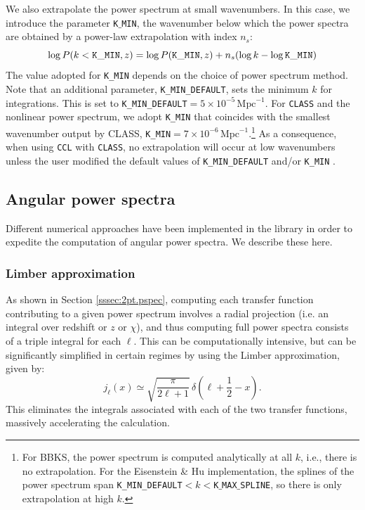 \documentclass[\docopts]{\docclass}
\begin{document}
We also extrapolate the power spectrum at small wavenumbers. In this case, we introduce the parameter {\tt K$\_$MIN}, the wavenumber below which the power spectra are obtained by a power-law extrapolation with index $n_s$:
\begin{equation}
  \log P(k<{\tt K\_MIN},z) = \log P({\tt K\_MIN},z) + n_s (\log k-\log{\tt K\_MIN})
\end{equation}
The value adopted for {\tt K\_MIN} depends on the choice of power spectrum method. Note that an additional parameter, {\tt K\_MIN\_DEFAULT}, sets the minimum $k$ for integrations. This is set to {\tt K\_MIN\_DEFAULT}$=5\times 10^{-5}\,\text{Mpc}^{-1}$. For {\tt CLASS} and the nonlinear power spectrum, we adopt {\tt K\_MIN} that coincides with the smallest wavenumber output by CLASS, {\tt K\_MIN}$=7\times 10^{-6}\,\text{Mpc}^{-1}$.\footnote{For BBKS, the power spectrum is computed analytically at all $k$, i.e., there is no extrapolation. For the Eisenstein \& Hu implementation, the splines of the power spectrum span {\tt K\_MIN\_DEFAULT}$<k<${\tt K$\_$MAX$\_$SPLINE}, so there is only extrapolation at high $k$.} As a consequence, when using {\tt CCL} with {\tt CLASS}, no extrapolation will occur at low wavenumbers unless the user modified the default values of {\tt K\_MIN\_DEFAULT} and/or {\tt K\_MIN} .

\subsection{Angular power spectra}

Different numerical approaches have been implemented in the library in order to expedite the computation of angular power spectra. We describe these here.

\subsubsection{Limber approximation}

As shown in Section \ref{sssec:2pt.pspec}, computing each transfer function contributing to a given power spectrum involves a radial projection (i.e. an integral over redshift or $z$ or $\chi$), and thus computing full power spectra consists of a triple integral for each $\ell$. This can be computationally intensive, but can be significantly simplified in certain regimes by using the Limber approximation, given by:
\begin{equation}
 j_\ell(x)\simeq\sqrt{\frac{\pi}{2\ell+1}}\,\delta\left(\ell+\frac{1}{2}-x\right).
\end{equation}
This eliminates the integrals associated with each of the two transfer functions, massively accelerating the calculation.
\end{document}
